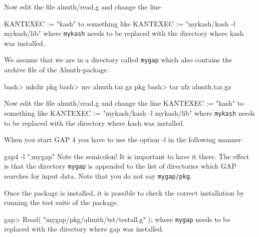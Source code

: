  Now edit the file alnuth/read.g and change the line
 
\beginexample
    KANTEXEC := "kash"
\endexample
    to something like
\beginexample
    KANTEXEC := "mykash/kash -l mykash/lib"
\endexample
    where {\tt mykash} needs to be replaced with the directory where kash
    was installed.


\medskip
{}
 
    We assume that we are in a directory called  {\tt mygap}  which also
    contains the archive file of the Alnuth-package.
 
\beginexample
    bash> mkdir pkg
    bash> mv alnuth.tar.gz pkg
    bash> tar xfz alnuth.tar.gz
\endexample

    Now edit the file alnuth/read.g and change the line
\beginexample 
    KANTEXEC := "kash"
\endexample 
    to something like
\beginexample
    KANTEXEC := "mykash/kash -l mykash/lib"
\endexample 
    where {\tt mykash} needs to be replaced with the directory where kash
    was installed.
 
    When you start GAP 4 you have to use the option -l in the
    following manner:
 
\beginexample
    gap4 -l ";mygap"
\endexample 
    Note the semicolon!  It is important to have it there.  The effect
    is that the directory {\tt mygap} is appended to the list of
    directories which GAP searches for input data.  Note that you do
    not say {\tt mygap/pkg}.


\medskip
{}
 
    Once the package is installed, it is possible to check the correct
    installation by running the test suite of the package. 

\beginexample
    gap> Read( "mygap/pkg/alnuth/tst/testall.g" );
\endexample
    where {\tt mygap} needs to be replaced with the directory where gap
    was installed.









